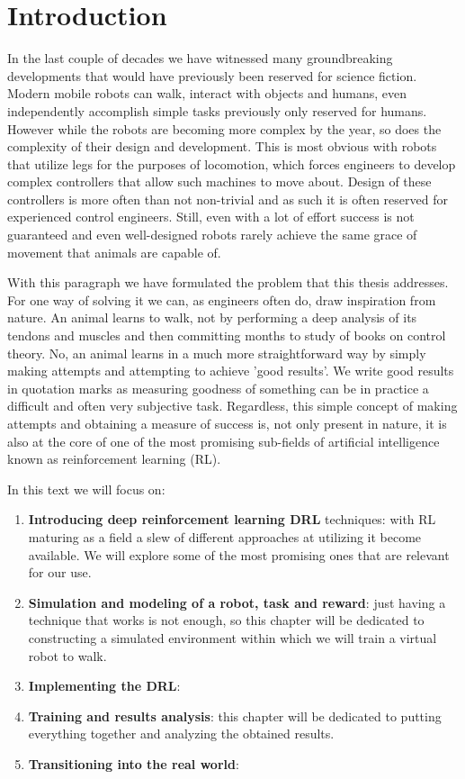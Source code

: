 \chapter{Introduction}


In the last couple of decades we have witnessed many groundbreaking developments that would have previously been reserved for science fiction. Modern mobile robots can walk, interact with objects and humans, even independently accomplish simple tasks previously only reserved for humans. However while the robots are becoming more complex by the year, so does the complexity of their design and development. This is most obvious with robots that utilize legs for the purposes of locomotion, which forces engineers to develop complex controllers that allow such machines to move about. Design of these controllers is more often than not non-trivial and as such it is often reserved for experienced control engineers. Still, even with a lot of effort success is not guaranteed and even well-designed robots rarely achieve the same grace of movement that animals are capable of.

With this paragraph we have formulated the problem that this thesis addresses. For one way of solving it we can, as engineers often do, draw inspiration from nature. An animal learns to walk, not by performing a deep analysis of its tendons and muscles and then committing months to study of books on control theory. No, an animal learns in a much more straightforward way by simply making attempts and attempting to achieve 'good results'. We write good results in quotation marks as measuring goodness of something can be in practice a difficult and often very subjective task. Regardless, this simple concept of making attempts and obtaining a measure of success is, not only present in nature, it is also at the core of one of the most promising sub-fields of artificial intelligence known as reinforcement learning (\ac{RL}). 

\newpage

In this text we will focus on:
\begin{enumerate}[leftmargin=2cm]
\item \textbf{Introducing deep reinforcement learning \ac{DRL}} techniques: with \ac{RL} maturing as a field a slew of different approaches at utilizing it become available. We will explore some of the most promising ones that are relevant for our use. 
\item \textbf{Simulation and modeling of a robot, task and reward}: just having a technique that works is not enough, so this chapter will be dedicated to constructing a simulated environment within which we will train a virtual robot to walk.
\item \textbf{Implementing the \ac{DRL}}:  
\item \textbf{Training and results analysis}: this chapter will be dedicated to putting everything together and analyzing the obtained results.
\item \textbf{Transitioning into the real world}: 
\end{enumerate}

